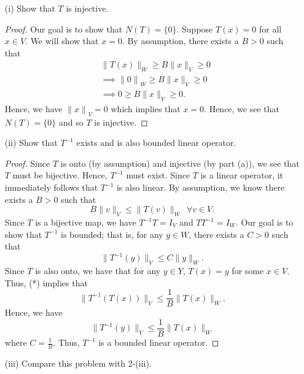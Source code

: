 \documentclass[a4paper]{article}
\begin{document}
\begin{enumerate}
    \item[(i)] Show that \( T  \) is injective.
        \begin{proof}
        Our goal is to show that \( N(T) = \{ 0  \}  \). Suppose \( T(x) = 0  \) for all \( x \in V  \). We will show that \( x = 0  \). By assumption, there exists a \( B > 0  \) such that 
        \begin{align*}
            &\|T(x)\|_{W} \geq B \| x \|_{V} \geq 0  \\
            &\implies {\|0\|}_{W} \geq B \|x\|_{V} \geq 0   \\
            &\implies 0 \geq B \|x\|_{V} \geq 0. 
        \end{align*}
        Hence, we have \( {\|x\|}_{V} = 0  \) which implies that \( x = 0  \). Hence, we see that \( N(T) =  \{ 0  \}  \) and so \( T  \) is injective.
        \end{proof}
    \item[(ii)] Show that \( T^{-1} \) exists and is also bounded linear operator.
        \begin{proof}
        Since \( T  \) is onto (by assumption) and injective (by part (a)), we see that \( T  \) must be bijective. Hence, \( T^{-1} \) must exist. Since \( T  \) is a linear operator, it immediately follows that \( T^{-1} \) is also linear. By assumption, we know there exists a \( B > 0  \) such that 
        \[  B\|v\|_{V} \leq  \|T(v)\|_{W} \ \  \forall v \in V.  \tag{*}\]
        Since \( T  \) is a bijective map, we have \( T^{-1}T = {I}_{V} \) and \( TT^{-1} = {I}_{W} \). Our goal is to show that \( T^{-1} \) is bounded; that is,
        for any \( y \in W  \), there exists a \( C > 0  \) such that 
        \[  \|T^{-1}(y)\|_{V} \leq C \|y\|_{W}.  \]
        Since \( T  \) is also onto, we have that for any \( y \in Y \), \( T(x) = y  \) for some \( x \in V  \). Thus, (*) implies that 
        \[  \|T^{-1}(T(x)) \|_{V} \leq \frac{ 1 }{ B } \|T(x)\|_{W}. \]
        Hence, we have 
        \[  \|T^{-1}(y)\|_{V} \leq \frac{ 1 }{ B }  \|T(x)\|_{W} \]
        where \( C = \frac{ 1 }{ B }  \). Thus, \( T^{-1} \) is a bounded linear operator.
        \end{proof}
    \item[(iii)] Compare this problem with 2-(iii).
       \begin{solution}
       
       \end{solution} 
\end{enumerate}
\end{document}
